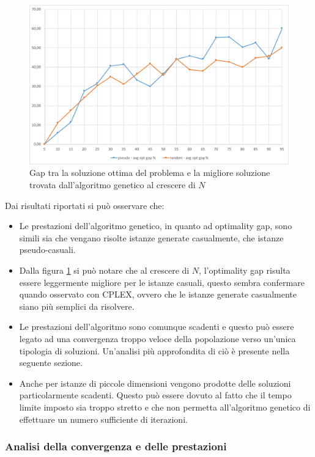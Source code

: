 \begin{figure}[htbp]
	\centering
	\includegraphics[width=\textwidth]{immagini/ga-opt-gap.pdf}
	\caption{Gap tra la soluzione ottima del problema e la migliore soluzione trovata dall'algoritmo genetico al crescere di $N$}\label{fig:ga-gap}
\end{figure}

Dai risultati riportati si può osservare che:

\begin{itemize}
	\item Le prestazioni dell'algoritmo genetico, in quanto ad optimality gap, sono simili sia che vengano risolte istanze generate casualmente, che istanze pseudo-casuali. \item Dalla figura \ref{fig:ga-gap} si può notare che al crescere di $N$, l'optimality gap risulta essere leggermente migliore per le istanze casuali, questo sembra confermare quando osservato con CPLEX, ovvero che le istanze generate casualmente siano più semplici da risolvere.
	\item Le prestazioni dell'algoritmo sono comunque scadenti e questo può essere legato ad una convergenza troppo veloce della popolazione verso un'unica tipologia di soluzioni. Un'analisi più approfondita di ciò è presente nella seguente sezione.
	\item Anche per istanze di piccole dimensioni vengono prodotte delle soluzioni particolarmente scadenti. Questo può essere dovuto al fatto che il tempo limite imposto sia troppo stretto e che non permetta all'algoritmo genetico di effettuare un numero sufficiente di iterazioni.
\end{itemize}

\subsubsection{Analisi della convergenza e delle prestazioni}

